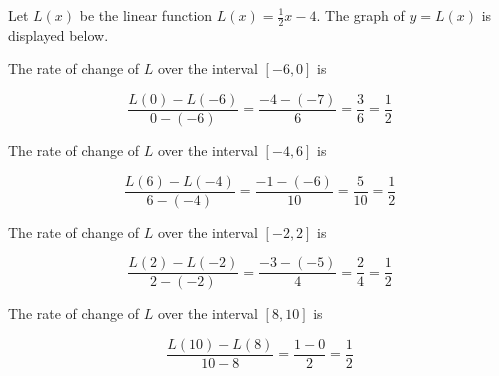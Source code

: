 \documentclass{ximera}
\begin{document}
\begin{example} 



Let $L(x)$ be the linear function $L(x) = \frac{1}{2} x - 4$.  The graph of $y = L(x)$ is displayed below. 

\begin{image}
\end{image}




The rate of change of $L$ over the interval $[-6, 0]$ is

\[
\frac{L(0) - L(-6)}{0 - (-6)} = \frac{-4 - (-7)}{6} = \frac{3}{6} = \frac{1}{2}
\]





The rate of change of $L$ over the interval $[-4, 6]$ is

\[
\frac{L(6) - L(-4)}{6 - (-4)} = \frac{-1 - (-6)}{10} = \frac{5}{10} = \frac{1}{2}
\]






The rate of change of $L$ over the interval $[-2, 2]$ is

\[
\frac{L(2) - L(-2)}{2 - (-2)} = \frac{-3 - (-5)}{4} = \frac{2}{4} = \frac{1}{2}
\]




The rate of change of $L$ over the interval $[8, 10]$ is

\[
\frac{L(10) - L(8)}{10 - 8} = \frac{1 - 0}{2} = \frac{1}{2}
\]




\end{example}
\end{document}
